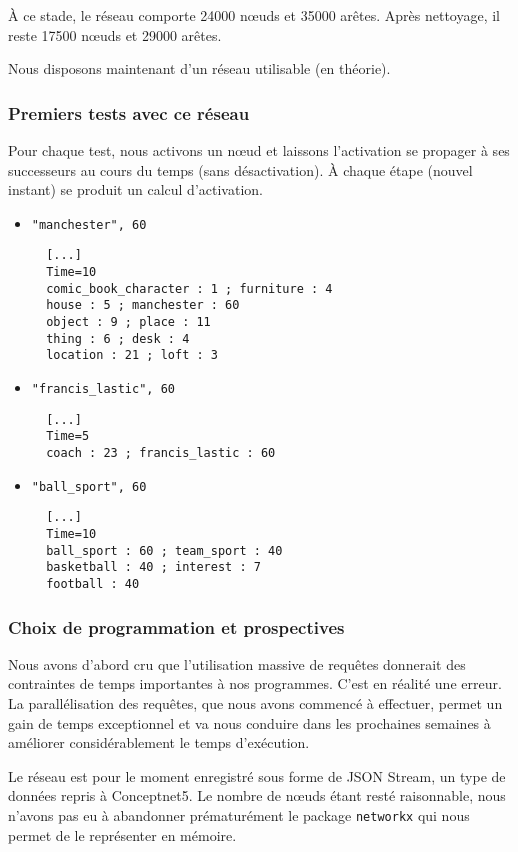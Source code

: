 \documentclass[a4paper, 12pt]{article}
\newcommand{\pyt}[1]{\texttt{#1}}%
\begin{document}
\`A  ce stade, le réseau comporte 24000 nœuds et 35000 arêtes. Après nettoyage, il reste 17500 nœuds et 29000 arêtes.

Nous disposons maintenant d'un réseau utilisable (en théorie).

\subsubsection{Premiers tests avec ce réseau}

Pour chaque test, nous activons un nœud et laissons l'activation se propager à ses successeurs au cours du temps (sans désactivation). \`A chaque étape (nouvel instant) se produit un calcul d'activation.

\begin{itemize}
 \item \verb|"manchester", 60|
 \begin{verbatim}
  [...]
  Time=10
  comic_book_character : 1 ; furniture : 4
  house : 5 ; manchester : 60
  object : 9 ; place : 11
  thing : 6 ; desk : 4
  location : 21 ; loft : 3
 \end{verbatim}
\item \verb|"francis_lastic", 60|
\begin{verbatim}
  [...]
  Time=5
  coach : 23 ; francis_lastic : 60
\end{verbatim}
\item \verb|"ball_sport", 60|
\begin{verbatim}
  [...]
  Time=10
  ball_sport : 60 ; team_sport : 40
  basketball : 40 ; interest : 7
  football : 40
\end{verbatim}
\end{itemize}

\subsubsection{Choix de programmation et prospectives}

Nous avons d'abord cru que l'utilisation massive de requêtes donnerait des contraintes de temps importantes à nos programmes. C'est en réalité une erreur. La parallélisation des requêtes, que nous avons commencé à effectuer, permet un gain de temps exceptionnel et va nous conduire dans les prochaines semaines à améliorer considérablement le temps d'exécution.

Le réseau est pour le moment enregistré sous forme de JSON Stream, un type de données repris à Conceptnet5. Le nombre de nœuds étant resté raisonnable, nous n'avons pas eu à abandonner prématurément le package \pyt{networkx} qui nous permet de le représenter en mémoire.
\end{document}
